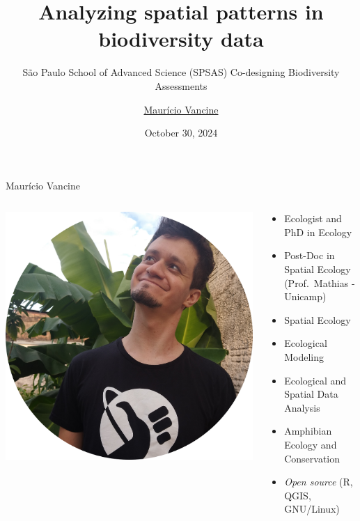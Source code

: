 \documentclass[
  ignorenonframetext,
]{beamer}
\title{Analyzing spatial patterns in biodiversity data}
\subtitle{São Paulo School of Advanced Science (SPSAS) Co-designing
Biodiversity Assessments}
\author{\href{https://mauriciovancine.github.io/}{Maurício Vancine}}
\date{October 30, 2024}
\providecommand{\tightlist}{%
  \setlength{\itemsep}{0pt}\setlength{\parskip}{0pt}}\usepackage{longtable,booktabs,array}
\begin{document}
\frame{\titlepage}

\begin{frame}{Maurício Vancine}
\label{mauruxedcio-vancine}
\begin{columns}[T]
\begin{column}{0.35\textwidth}
\includegraphics{img/avatar.png}
\end{column}

\begin{column}{0.65\textwidth}
\begin{itemize}
\tightlist
\item
  Ecologist and PhD in Ecology
\item
  Post-Doc in Spatial Ecology (Prof.~Mathias - Unicamp)
\item
  Spatial Ecology
\item
  Ecological Modeling
\item
  Ecological and Spatial Data Analysis
\item
  Amphibian Ecology and Conservation
\item
  \emph{Open source} (R, QGIS, GNU/Linux)
\end{itemize}
\end{column}
\end{columns}
\end{frame}
\end{document}
